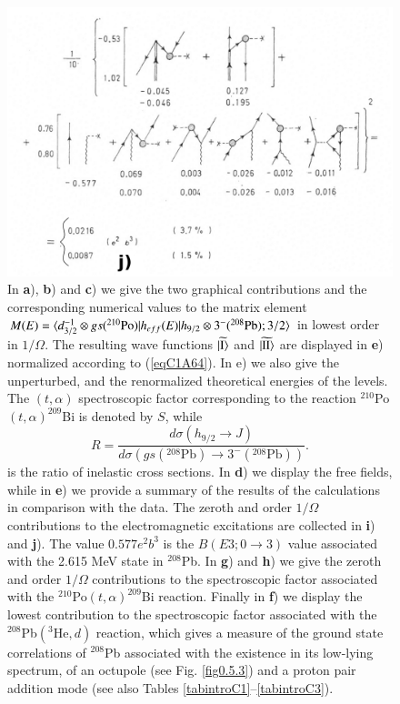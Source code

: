                    \begin{figure}
                   \captionsetup{singlelinecheck=off}
                   \centerline {
                   \includegraphics*[width=12cm]{introduccion/figs/fig24c}
                   }
                   \caption[.]{In \textbf{a}), \textbf{b}) and \textbf{c}) we give the two graphical contributions and the corresponding numerical values to the matrix element $M(E)=\langle {d_{3/2}^{-1}\otimes gs(^{210}\text{Po})|h_{eff}(E)|h_{9/2}\otimes 3^-(^{208}\text{Pb});3/2} \rangle$ in lowest order in $1/\Omega.$ The resulting wave functions $\widetilde{|{\text{I}} \rangle}$ and $\widetilde{|{\text{II}} \rangle}$ are displayed in \textbf{e}) normalized according to (\ref{eqC1A64}). In e) we also give the unperturbed, and the renormalized theoretical energies of the levels. The $(t,\alpha)$ spectroscopic factor corresponding to the reaction $^{210}$Po$(t,\alpha)^{209}$Bi is denoted by $S$, while 
                   \begin{equation*}
                   R=\frac{d\sigma(h_{9/2}\rightarrow J)}{d\sigma(gs(^{208}\text{Pb})\rightarrow3^-(^{208}\text{Pb}))}.
                   \end{equation*}
                   is the ratio of inelastic cross sections. In \textbf{d}) we display the free fields, while in \textbf{e}) we provide a summary of the results of the calculations in comparison with the data. The zeroth and order $1/\Omega$ contributions to the electromagnetic excitations are collected in \textbf{i}) and \textbf{j}). The value $0.577 e^2b^3$ is the $B(E3;0\rightarrow 3)$ value associated with the 2.615 MeV state in $^{208}$Pb. In \textbf{g}) and \textbf{h}) we give the zeroth and order $1/\Omega$ contributions to the spectroscopic factor associated with the $^{210}$Po$(t,\alpha)^{209}$Bi reaction. Finally in \textbf{f}) we display the lowest contribution to the spectroscopic factor associated with the $^{208}$Pb$(^3\text{He},d)$ reaction, which gives a measure of the ground state correlations of $^{208}$Pb associated with the existence in its low-lying spectrum, of an octupole (see Fig. \ref{fig0.5.3}) and a proton pair addition mode (see also Tables \ref{tabintroC1}--\ref{tabintroC3}).}
                   \label{figC1A7}
                   \end{figure}
